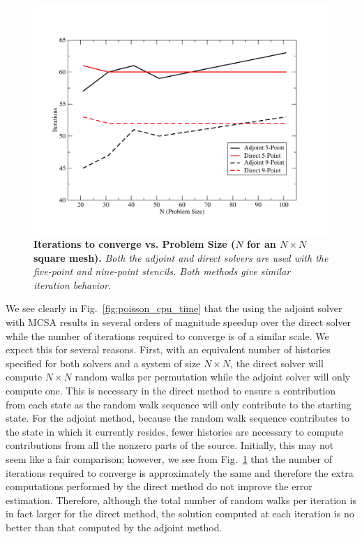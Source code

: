 \begin{figure}[h!]
  \centering
  \includegraphics[width=5in,clip]{chapters/research_proposal/Adjoint_Direct_Iterations.pdf}
  \caption{\textbf{Iterations to converge vs. Problem Size ($N$ for an
      $N \times N$ square mesh).} \textit{Both the adjoint and direct
      solvers are used with the five-point and nine-point
      stencils. Both methods give similar iteration behavior.}}
  \label{fig:poisson_iterations}
\end{figure}

We see clearly in Fig.~\ref{fig:poisson_cpu_time} that the using the
adjoint solver with MCSA results in several orders of magnitude
speedup over the direct solver while the number of iterations required
to converge is of a similar scale. We expect this for several
reasons. First, with an equivalent number of histories specified for
both solvers and a system of size $N \times N$, the direct solver will
compute $N \times N$ random walks per permutation while the adjoint
solver will only compute one. This is necessary in the direct method
to ensure a contribution from each state as the random walk sequence
will only contribute to the starting state. For the adjoint method,
because the random walk sequence contributes to the state in which it
currently resides, fewer histories are necessary to compute
contributions from all the nonzero parts of the source. Initially,
this may not seem like a fair comparison; however, we see from
Fig.~\ref{fig:poisson_iterations} that the number of iterations
required to converge is approximately the same and therefore the extra
computations performed by the direct method do not improve the error
estimation. Therefore, although the total number of random walks per
iteration is in fact larger for the direct method, the solution
computed at each iteration is no better than that computed by the
adjoint method.

